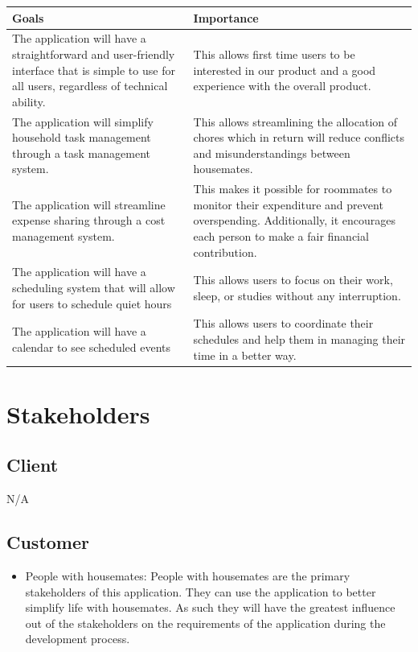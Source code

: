 \documentclass[12pt]{article}
\begin{document}
\begin{center}
\begin{tabular}{|p{6cm}|p{6cm}|}
\hline
\textbf{Goals} & \textbf{Importance}\\
\hline The application will have a straightforward and user-friendly interface that is simple to use for all users, regardless of technical ability. & This allows first time users to be interested in our product and a good experience with the overall product. \\
\hline
The application will simplify household task management through a task management system. & This allows streamlining the allocation of chores which in return will reduce conflicts and misunderstandings between housemates. \\
\hline
The application will streamline expense sharing through a cost management system. & This makes it possible for roommates to monitor their expenditure and prevent overspending. Additionally, it encourages each person to make a fair financial contribution. \\
\hline
The application will have a scheduling system that will allow for users to schedule quiet hours & This allows users to focus on their work, sleep, or studies without any interruption. \\
\hline
The application will have a calendar to see scheduled events & This allows users to coordinate their schedules and help them in managing their time in a better way. \\
\hline
\end{tabular}
\end{center}

\section{Stakeholders}
\subsection{Client}

N/A

\subsection{Customer}

\begin{itemize}
    \item People with housemates: People with housemates are the primary stakeholders of this application. They can use the application to better simplify life with housemates. As such they will have the greatest influence out of the stakeholders on the requirements of the application during the development process.
\end{itemize}
\end{document}
